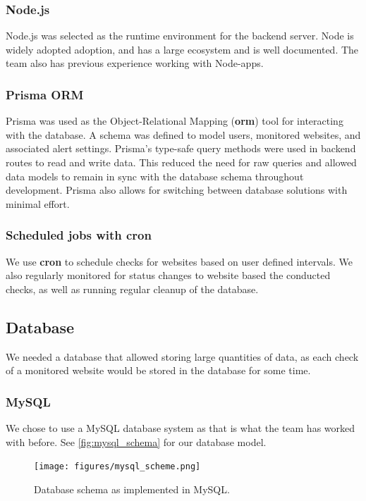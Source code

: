 \subsubsection{Node.js}
Node.js was selected as the runtime environment for the backend server. Node is widely adopted adoption, and has a large ecosystem and is well documented. The team also has previous experience working with Node-apps. 

\subsubsection{Prisma ORM}
Prisma was used as the Object-Relational Mapping (\textbf{\acrshort{orm}}) tool for interacting with the database. A schema was defined to model users, monitored websites, and associated alert settings. Prisma’s type-safe query methods were used in backend routes to read and write data. This reduced the need for raw  queries and allowed data models to remain in sync with the database schema throughout development. Prisma also allows for switching between database solutions with minimal effort.

\subsubsection{Scheduled jobs with \gls{cron}}
We use \textbf{cron} to schedule checks for websites based on user defined intervals. We also regularly monitored for status changes to website based the conducted checks,  as well as running regular cleanup of the database.

\subsection{Database}
We needed a database that allowed storing large quantities of data, as each check of a monitored website would be stored in the database for some time.

\subsubsection{MySQL}
We chose to use a MySQL database system as that is what the team has worked with before. See \autoref{fig:mysql_schema} for our database model.



\begin{figure}[H]
    \centering
    \texttt{[image: figures/mysql\_scheme.png]}
    \caption{Database schema as implemented in MySQL.}
    \label{fig:mysql_schema}
\end{figure}


